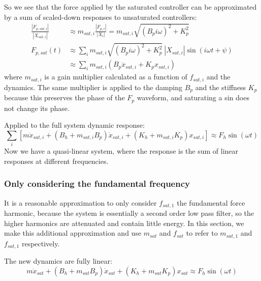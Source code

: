 \documentclass{ifacconf}
\begin{document}
So we see that the force applied by the saturated controller can be approximated by a sum of scaled-down responses to unsaturated controllers:
\begin{equation}\label{m-sat-intro}
\begin{aligned}
    \frac{|F_{p,sat,i}|}{|X_{sat,i}|} &\approx m_{sat,i} \frac{|F_{p,i}|}{|X_i|} = m_{sat,i} \sqrt{ (B_p i \omega)^2 + K_p^2} \\
    F_{p,sat}(t) &\approx \sum_i m_{sat,i} \sqrt{ (B_p i \omega)^2 + K_p^2} ~|X_{sat,i}| \sin(i \omega t + \psi) \\
    &\approx \sum_i m_{sat,i} (B_p \dot{x}_{sat,i} + K_p x_{sat,i} )
\end{aligned}
\end{equation}
where $m_{sat,i}$ is a gain multiplier calculated as a function of $f_{sat,i}$ and the dynamics. The same multiplier is applied to the damping $B_p$ and the stiffness $K_p$ because this preserves the phase of the $F_p$ waveform, and saturating a sin does not change its phase.

Applied to the full system dynamic response:
\begin{equation}
    \sum_i \left[ m \ddot{x}_{sat,i} + (B_h+m_{sat,i}B_p) \dot{x}_{sat,i} + (K_h + m_{sat,i}K_p) x_{sat,i} \right] \approx F_h \sin(\omega t)
\end{equation}
Now we have a quasi-linear system, where the response is the sum of linear responses at different frequencies.

\subsubsection{Only considering the fundamental frequency}
It is a reasonable approximation to only consider $f_{sat,1}$ the fundamental force harmonic, because the system is essentially a second order low pass filter, so the higher harmonics are attenuated and contain little energy. In this section, we make this additional approximation and use $m_{sat}$ and $f_{sat}$ to refer to $m_{sat,1}$ and $f_{sat,1}$ respectively.

The new dynamics are fully linear:
\begin{equation}
    m \ddot{x}_{sat} + (B_h+m_{sat}B_p) \dot{x}_{sat} + (K_h + m_{sat}K_p) x_{sat} \approx F_h \sin(\omega t)
\end{equation}
\end{document}

